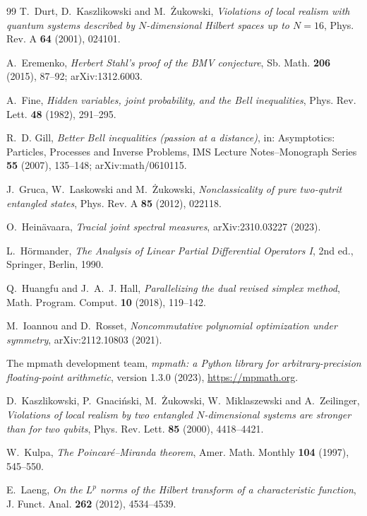 \documentclass[11pt]{article}
\theoremstyle{remark}
\numberwithin{equation}{section}
\begin{document}
\begin{thebibliography}{99}
T.~Durt, D.~Kaszlikowski and M.~\.Zukowski, \emph{Violations of local realism with quantum systems described by
$N$-dimensional Hilbert spaces up to $N=16$}, Phys. Rev. A \textbf{64} (2001), 024101.

A.~Eremenko, \emph{Herbert Stahl's proof of the BMV conjecture}, Sb. Math. \textbf{206} (2015), 87--92;
arXiv:1312.6003.

A.~Fine, \emph{Hidden variables, joint probability, and the Bell inequalities}, Phys. Rev. Lett. \textbf{48} (1982),
291--295.

R.~D. Gill, \emph{Better Bell inequalities (passion at a distance)}, in: Asymptotics: Particles, Processes and Inverse
Problems, IMS Lecture Notes--Monograph Series \textbf{55} (2007), 135--148; arXiv:math/0610115.

J.~Gruca, W.~Laskowski and M.~\.Zukowski, \emph{Nonclassicality of pure two-qutrit entangled states}, Phys. Rev. A
\textbf{85} (2012), 022118.

O.~Hein\"avaara, \emph{Tracial joint spectral measures}, arXiv:2310.03227 (2023).

L.~H\"ormander, \emph{The Analysis of Linear Partial Differential Operators I}, 2nd ed., Springer, Berlin, 1990.

Q.~Huangfu and J.~A.~J. Hall, \emph{Parallelizing the dual revised simplex method}, Math. Program. Comput. \textbf{10}
(2018), 119--142.

M.~Ioannou and D.~Rosset, \emph{Noncommutative polynomial optimization under symmetry}, arXiv:2112.10803 (2021).

The mpmath development team, \emph{mpmath: a Python library for arbitrary-precision floating-point arithmetic}, version
1.3.0 (2023), \url{https://mpmath.org}.

D.~Kaszlikowski, P.~Gnaci\'nski, M.~\.Zukowski, W.~Miklaszewski and A.~Zeilinger, \emph{Violations of local realism by
two entangled $N$-dimensional systems are stronger than for two qubits}, Phys. Rev. Lett. \textbf{85} (2000), 4418--4421.

W.~Kulpa, \emph{The Poincar\'e--Miranda theorem}, Amer. Math. Monthly \textbf{104} (1997), 545--550.

E.~Laeng, \emph{On the $L^p$ norms of the Hilbert transform of a characteristic function}, J. Funct. Anal. \textbf{262}
(2012), 4534--4539.


\end{thebibliography}
\end{document}
